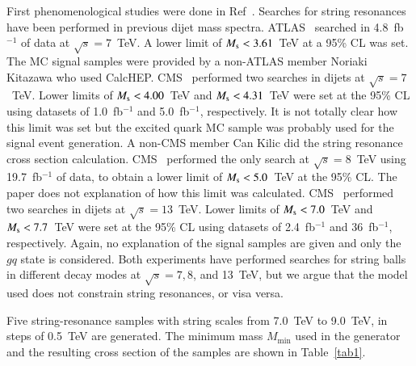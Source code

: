First phenomenological studies were done in
Ref~\cite{Anchordoqui:2007da,Anchordoqui:2009mm,Kitazawa:2010gh,Anchordoqui:2014wha}. 
Searches for string resonances have been performed in previous dijet
mass spectra.
ATLAS~\cite{ATLAS:2012pu} searched in 4.8~fb$^{-1}$ of data at $\sqrt{s}
= 7$~TeV.
A lower limit of $M_\mathrm{s} < 3.61$~TeV at a 95\% CL was set.
The MC signal samples were provided by a non-ATLAS member Noriaki
Kitazawa who used CalcHEP.
CMS~\cite{Chatrchyan:2011ns,CMS:2012yf} performed two searches in dijets
at $\sqrt{s} = 7$~TeV.
Lower limits of $M_\mathrm{s} < 4.00$~TeV and $M_\mathrm{s} < 4.31$~TeV were set at the
95\% CL using datasets of 1.0~fb$^{-1}$ and 5.0~fb$^{-1}$, respectively. 
It is not totally clear how this limit was set but the excited
quark MC sample was probably used for the signal event generation. 
A non-CMS member Can Kilic did the string resonance cross section
calculation. 
CMS~\cite{Khachatryan:2015sja} performed the only search at $\sqrt{s} =
8$~TeV using 19.7~fb$^{-1}$ of data, to obtain a lower limit of $M_\mathrm{s} <
5.0$~TeV at the 95\% CL.
The paper does not explanation of how this limit was calculated.
CMS~\cite{Khachatryan:2015dcf,Sirunyan:2018xlo} performed two searches
in dijets at $\sqrt{s} = 13$~TeV. 
Lower limits of $M_\mathrm{s} < 7.0$~TeV and $M_\mathrm{s} < 7.7$~TeV were set at the
95\% CL using datasets of 2.4~fb$^{-1}$ and 36~fb$^{-1}$, respectively. 
Again, no explanation of the signal samples are given and only the $gq$
state is considered.
Both experiments have performed searches for string balls in different
decay modes at $\sqrt{s} = 7, 8$, and 13~TeV, but we argue that the
model~\cite{Gingrich:2008di} used does not constrain string resonances,
or visa versa. 

Five string-resonance samples with string scales \Ms from 7.0~TeV to
9.0~TeV, in steps of 0.5~TeV are generated.
The minimum mass $M_\mathrm{min}$ used in the generator and the
resulting cross section of the samples are shown in Table~\ref{tab1}. 

